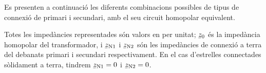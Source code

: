 Es presenten a continuació les diferents combinacions possibles de tipus de connexió de primari i secundari, amb el seu circuit homopolar equivalent.

Totes les impedàncies representades són valors en per unitat; $\cmplx{z}_0$ és la impedància homopolar del transformador, i $\cmplx{z}\ped{N1}$ i $\cmplx{z}\ped{N2}$ són les impedàncies de connexió a terra del debanats primari i secundari respectivament. En el cas d'estrelles connectades sòlidament a terra, tindrem $\cmplx{z}\ped{N1}=0$ i $\cmplx{z}\ped{N2}=0$.

\begin{center}
    
\end{center}


\begin{center}
    
\end{center}


\begin{center}
    
\end{center}


\begin{center}
    
\end{center}


\begin{center}
    
\end{center}


\begin{center}
    
\end{center}


\begin{center}
    
\end{center}


\begin{center}
    
\end{center}


